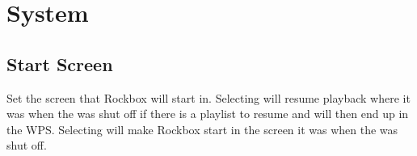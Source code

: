 \section{\label{ref:SystemOptions}System}
\subsection{Start Screen}
    Set the screen that Rockbox will start in. Selecting
     will resume playback where it was when the \dap{}
    was shut off if there is a playlist to resume and will then end up in the
    WPS. Selecting  will make Rockbox start in the
    screen it was when the \dap{} was shut off.


